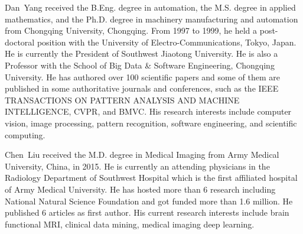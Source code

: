 \documentclass[journal]{IEEEtran}
\begin{document}
\begin{IEEEbiography}{Dan~Yang}
    received the B.Eng. degree in automation, the M.S. degree in applied mathematics, and the Ph.D. degree in machinery manufacturing and automation from Chongqing University, Chongqing. From 1997 to 1999, he held a post-doctoral position with the University of Electro-Communications, Tokyo, Japan. He is currently the President of Southwest Jiaotong University. He is also a Professor with the School of Big Data \& Software Engineering, Chongqing University. He has authored over 100 scientific papers and some of them are published in some authoritative journals and conferences, such as the IEEE TRANSACTIONS ON PATTERN ANALYSIS AND MACHINE INTELLIGENCE, CVPR, and BMVC. His research interests include computer vision, image processing, pattern recognition, software engineering,
and scientific computing.
\end{IEEEbiography}

\begin{IEEEbiography}{Chen~Liu}
    received the M.D. degree in Medical Imaging from Army Medical University, China, in 2015. He is currently an attending physicians in the Radiology Department of Southwest Hospital which is the first affiliated hospital of Army Medical University. He has hosted more than 6 research including National Natural Science Foundation and got funded more than 1.6 million. He published 6 articles as first author. His current research interests include brain functional MRI, clinical data mining, medical imaging deep learning.
\end{IEEEbiography}
\end{document}
